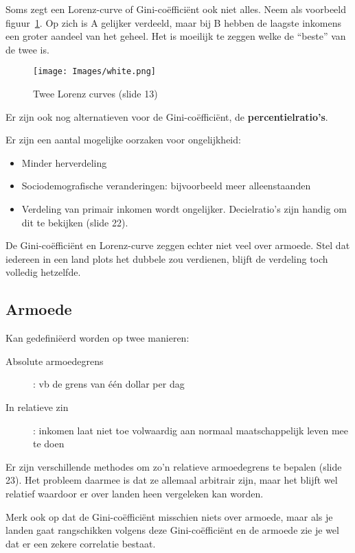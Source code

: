 Soms zegt een Lorenz-curve of Gini-co\"effici\"ent ook niet alles. Neem als voorbeeld figuur~\ref{fig:tweeLorenzCurves}. Op zich is A gelijker verdeeld, maar bij B hebben de laagste inkomens een groter aandeel van het geheel. Het is moeilijk te zeggen welke de ``beste'' van de twee is.
\begin{figure}[htbp]
   \centering
   \texttt{[image: Images/white.png]}
   \caption{Twee Lorenz curves (slide 13)}
   \label{fig:tweeLorenzCurves}
\end{figure}

Er zijn ook nog alternatieven voor de Gini-co\"effici\"ent, de \textbf{percentielratio's}.

Er zijn een aantal mogelijke oorzaken voor ongelijkheid:
\begin{itemize}
   \item Minder herverdeling
   \item Sociodemografische veranderingen: bijvoorbeeld meer alleenstaanden
   \item Verdeling van primair inkomen wordt ongelijker. Decielratio's zijn handig om dit te bekijken (slide 22).
\end{itemize}

De Gini-co\"effici\"ent en Lorenz-curve zeggen echter niet veel over armoede. Stel dat iedereen in een land plots het dubbele zou verdienen, blijft de verdeling toch volledig hetzelfde.

\subsection{Armoede}
Kan gedefini\"eerd worden op twee manieren:
\begin{description}
   \item[Absolute armoedegrens]: vb de grens van \'e\'en dollar per dag
   \item[In relatieve zin]: inkomen laat niet toe volwaardig aan normaal maatschappelijk leven mee te doen
\end{description}
Er zijn verschillende methodes om zo'n relatieve armoedegrens te bepalen (slide 23). Het probleem daarmee is dat ze allemaal arbitrair zijn, maar het blijft wel relatief waardoor er over landen heen vergeleken kan worden.

Merk ook op dat de Gini-co\"effici\"ent misschien niets over armoede, maar als je landen gaat rangschikken volgens deze Gini-co\"effici\"ent en de armoede zie je wel dat er een zekere correlatie bestaat.

